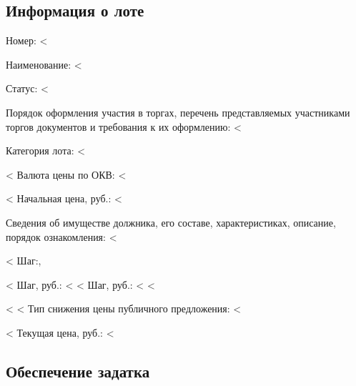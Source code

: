 \documentclass[a4paper,12pt]{article}
\begin{document}
{{{{{{{	\subsection*{Информация о лоте}
	{\color{Gray} Номер:} <%
	\par
	{\color{Gray} Наименование:} <%
	\par
	{\color{Gray} Статус:} <%
	\par
	{\color{Gray} Порядок оформления участия в торгах, перечень представляемых участниками торгов документов и требования к их оформлению:} <%
	\par
	{\color{Gray} Категория лота:} <%
	\par
	<%
		{\color{Gray} Валюта цены по ОКВ:} <%
		\par
	<%
	{\color{Gray} Начальная цена, руб.:} <%
	\par
	{\color{Gray} Сведения об имуществе должника, его составе, характеристиках, описание, порядок ознакомления:} <%
	\par
	<%
		{\color{Gray} Шаг:}, %
		\par
		<%
			{\color{Gray} Шаг, руб.:} <%
		<%
			{\color{Gray} Шаг, руб.:} <%
		<%
	\par
	<%
	<%
		{\color{Gray} Тип снижения цены публичного предложения:} <%
		\par
	<%
	{\color{Gray} Текущая цена, руб.:} <%

	\subsection*{Обеспечение задатка}

}}}}}}}
\end{document}
